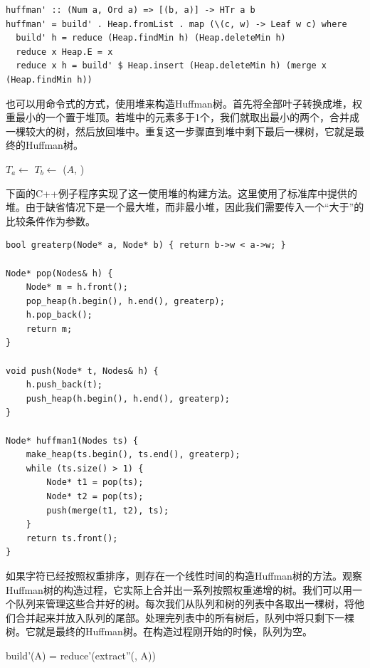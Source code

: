 \documentclass[b5paper]{ctexart}
\begin{document}
\lstset{language=Haskell}
\begin{lstlisting}[style=Haskell]
huffman' :: (Num a, Ord a) => [(b, a)] -> HTr a b
huffman' = build' . Heap.fromList . map (\(c, w) -> Leaf w c) where
  build' h = reduce (Heap.findMin h) (Heap.deleteMin h)
  reduce x Heap.E = x
  reduce x h = build' $ Heap.insert (Heap.deleteMin h) (merge x (Heap.findMin h))
\end{lstlisting} %

也可以用命令式的方式，使用堆来构造Huffman树。首先将全部叶子转换成堆，权重最小的一个置于堆顶。若堆中的元素多于1个，我们就取出最小的两个，合并成一棵较大的树，然后放回堆中。重复这一步骤直到堆中剩下最后一棵树，它就是最终的Huffman树。

\begin{algorithmic}[1]
  \State {}
    \State $T_a \gets$ 
    \State $T_b \gets$ 
    \State {}($A$, )
  \EndWhile
  \State \Return {}
\EndFunction
\end{algorithmic}

下面的C++例子程序实现了这一使用堆的构建方法。这里使用了标准库中提供的堆。由于缺省情况下是一个最大堆，而非最小堆，因此我们需要传入一个“大于”的比较条件作为参数。

\lstset{language=C++}
\begin{lstlisting}
bool greaterp(Node* a, Node* b) { return b->w < a->w; }

Node* pop(Nodes& h) {
    Node* m = h.front();
    pop_heap(h.begin(), h.end(), greaterp);
    h.pop_back();
    return m;
}

void push(Node* t, Nodes& h) {
    h.push_back(t);
    push_heap(h.begin(), h.end(), greaterp);
}

Node* huffman1(Nodes ts) {
    make_heap(ts.begin(), ts.end(), greaterp);
    while (ts.size() > 1) {
        Node* t1 = pop(ts);
        Node* t2 = pop(ts);
        push(merge(t1, t2), ts);
    }
    return ts.front();
}
\end{lstlisting}

如果字符已经按照权重排序，则存在一个线性时间的构造Huffman树的方法。观察Huffman树的构造过程，它实际上合并出一系列按照权重递增的树。我们可以用一个队列来管理这些合并好的树。每次我们从队列和树的列表中各取出一棵树，将他们合并起来并放入队列的尾部。处理完列表中的所有树后，队列中将只剩下一棵树。它就是最终的Huffman树。在构造过程刚开始的时候，队列为空。

\be
build'(A) = reduce'(extract''(\phi, A))
\ee
\end{document}
